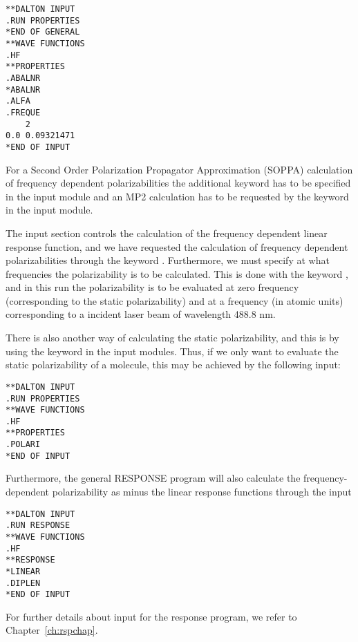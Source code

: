 \begin{verbatim}
**DALTON INPUT
.RUN PROPERTIES
*END OF GENERAL
**WAVE FUNCTIONS
.HF
**PROPERTIES
.ABALNR
*ABALNR
.ALFA
.FREQUE
    2
0.0 0.09321471
*END OF INPUT
\end{verbatim}

For a Second Order Polarization Propagator Approximation (SOPPA)
\cite{esnpjjodjcp73,jodpjdycpr2,mjpekdtehjajjojcp,ekdspasjpca102} calculation 
of frequency
dependent polarizabilities the additional keyword  has to be 
specified in the  input module and an MP2 calculation has to 
be requested by the keyword  in the  input 
module.   

The  input section controls the calculation of the
frequency dependent linear response
function,
and we have requested the calculation of frequency dependent
polarizabilities through
the keyword .
Furthermore, we must specify at what frequencies the polarizability is
to be calculated. This is done with the keyword , and in
this run the polarizability is to be evaluated at zero frequency
(corresponding to the static polarizability) and at a frequency (in
atomic units) corresponding to a incident laser beam of wavelength
488.8 nm.

There is also another way of calculating the static
 polarizability, and this is by using the
keyword  in the  input modules. Thus, if we only
want to evaluate the static polarizability of a molecule, this may be
achieved by the following input:

\begin{verbatim}
**DALTON INPUT
.RUN PROPERTIES
**WAVE FUNCTIONS
.HF 
**PROPERTIES
.POLARI
*END OF INPUT
\end{verbatim}

Furthermore, the general RESPONSE program will also calculate the
frequency-dependent polarizability
as minus the linear response functions through the input


\begin{verbatim}
**DALTON INPUT
.RUN RESPONSE
**WAVE FUNCTIONS
.HF
**RESPONSE
*LINEAR
.DIPLEN
*END OF INPUT
\end{verbatim}
For further details about input for the response program, we refer
to Chapter~\ref{ch:rspchap}.
